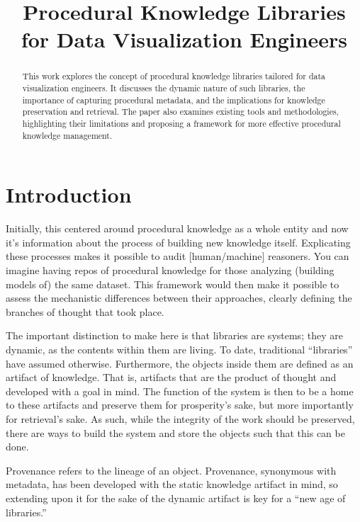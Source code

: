 \documentclass[
]{article}
\title{Procedural Knowledge Libraries for Data Visualization Engineers}
\author{}
\date{}
\renewcommand*\contentsname{Table of contents}
\newcommand\contentsname{Table of contents}
\begin{document}
\maketitle
\begin{abstract}
This work explores the concept of procedural knowledge libraries
tailored for data visualization engineers. It discusses the dynamic
nature of such libraries, the importance of capturing procedural
metadata, and the implications for knowledge preservation and retrieval.
The paper also examines existing tools and methodologies, highlighting
their limitations and proposing a framework for more effective
procedural knowledge management.
\end{abstract}

\renewcommand*\contentsname{Table of Contents}
{
\hypersetup{linkcolor=}
\setcounter{tocdepth}{2}
\tableofcontents
}

\section{Introduction}\label{introduction}

Initially, this centered around procedural knowledge as a whole entity
and now it's information about the process of building new knowledge
itself. Explicating these processes makes it possible to audit
{[}human/machine{]} reasoners. You can imagine having repos of
procedural knowledge for those analyzing (building models of) the same
dataset. This framework would then make it possible to assess the
mechanistic differences between their approaches, clearly defining the
branches of thought that took place.

The important distinction to make here is that libraries are systems;
they are dynamic, as the contents within them are living. To date,
traditional ``libraries'' have assumed otherwise. Furthermore, the
objects inside them are defined as an artifact of knowledge. That is,
artifacts that are the product of thought and developed with a goal in
mind. The function of the system is then to be a home to these artifacts
and preserve them for prosperity's sake, but more importantly for
retrieval's sake. As such, while the integrity of the work should be
preserved, there are ways to build the system and store the objects such
that this can be done.

Provenance refers to the lineage of an object. Provenance, synonymous
with metadata, has been developed with the static knowledge artifact in
mind, so extending upon it for the sake of the dynamic artifact is key
for a ``new age of libraries.''
\end{document}

